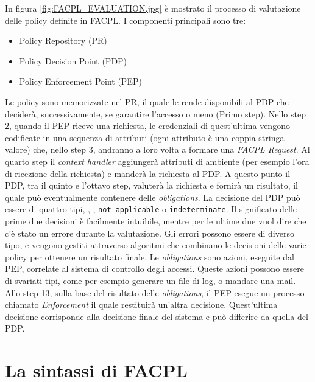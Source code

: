In figura \ref{fig:FACPL_EVALUATION.jpg} è mostrato il processo di valutazione delle policy definite in FACPL.
I componenti principali sono tre:
\begin{itemize}
\item{Policy Repository (PR)}
\item{Policy Decision Point (PDP)}
\item{Policy Enforcement Point (PEP)}
\end{itemize}
Le policy sono memorizzate nel PR, il quale le rende disponibili al PDP che deciderà, successivamente, se garantire l'accesso o meno (Primo step).
Nello step 2, quando il PEP riceve una richiesta, le credenziali di quest'ultima vengono codificate in una sequenza di attributi (ogni attributo è una coppia stringa valore) che, nello step 3, andranno a loro volta a formare una \textit{FACPL Request}.
Al quarto step il \textit{context handler} aggiungerà attributi di ambiente (per esempio l'ora di ricezione della richiesta) e manderà la richiesta al PDP.
A questo punto il PDP, tra il quinto e l'ottavo step, valuterà la richiesta e fornirà un risultato, il quale può eventualmente contenere delle \textit{obligations}.
La decisione del PDP può essere di quattro tipi, \permit, \deny, \texttt{not-applicable} o \texttt{indeterminate}.
Il significato delle prime due decisioni è facilmente intuibile, mentre per le ultime due vuol dire che c'è stato un errore durante la valutazione.
Gli errori possono essere di diverso tipo, e vengono gestiti attraverso algoritmi che combinano le decisioni delle varie policy per ottenere un risultato finale.
Le \textit{obligations} sono azioni, eseguite dal PEP, correlate al sistema di controllo degli accessi. Queste azioni possono essere di svariati tipi, come per esempio generare un file di log, o mandare una mail.
Allo step 13, sulla base del risultato delle \textit{obligations}, il PEP esegue un processo chiamato \textit{Enforcement} il quale restituirà un'altra decisione.
Quest'ultima decisione corrisponde alla decisione finale del sistema e può differire da quella del PDP.


\section{La sintassi di FACPL}
\label{sec:facpl_syntax}



